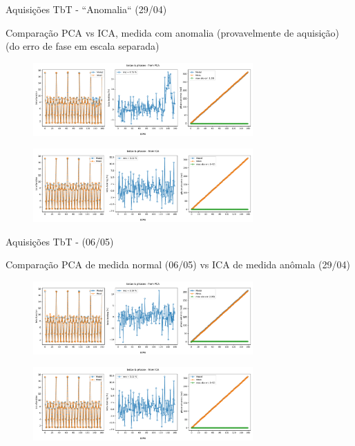 \documentclass[aspectratio=169]{beamer}            %
\begin{document}
\begin{frame}{Aquisições TbT - ``Anomalia`` (29/04)}

{\tiny Comparação PCA vs ICA, medida com anomalia (provavelmente de aquisição) (do erro de fase em escala separada) } 
    \begin{figure}
        \centering
        \includegraphics[width=0.75\textwidth]{2024-05-10/figures/beta_beat_PCA_050urad_kickh_290424.pdf}
    \end{figure}
    \begin{figure}
        \centering
        \includegraphics[width=0.75\textwidth]{2024-05-10/figures/beta_beat_ICA_050urad_kickh_290424.pdf}
    \end{figure}
\end{frame}
\begin{frame}{Aquisições TbT - (06/05)}

{\tiny Comparação PCA de medida normal (06/05) vs ICA de medida anômala (29/04)}
\begin{figure}
        \centering
        \includegraphics[width=0.75\textwidth]{2024-05-10/figures/beta_beat_PCA_100urad_kickh_060524.pdf}
    \end{figure}
    \begin{figure}
        \centering
        \includegraphics[width=0.75\textwidth]{2024-05-10/figures/beta_beat_ICA_050urad_kickh_290424.pdf}
    \end{figure}
\end{frame}
\end{document}
